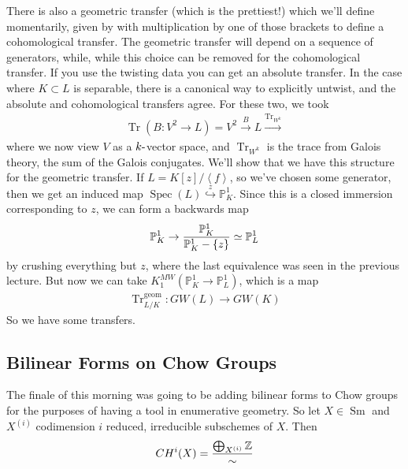 There is also a geometric transfer (which is the prettiest!) which we'll
define momentarily, given by with multiplication by one of those
brackets to define a cohomological transfer. The geometric transfer will
depend on a sequence of generators, while, while this choice can be
removed for the cohomological transfer. If you use the twisting data you
can get an absolute transfer. In the case where \(K\subset L\) is
separable, there is a canonical way to explicitly untwist, and the
absolute and cohomological transfers agree. For these two, we took
\begin{align*}
\operatorname{Tr}(B: V^2 \to L) = V^2 \xrightarrow{B} L \xrightarrow{\operatorname{Tr}_{W^k}}
\end{align*}
where we now view \(V\) as a \(k{\hbox{-}}\)vector space, and
\(\operatorname{Tr}_{W^k}\) is the trace from Galois theory, the sum of
the Galois conjugates. We'll show that we have this structure for the
geometric transfer. If \(L = K[z]/\left\langle{f}\right\rangle\), so
we've chosen some generator, then we get an induced map
\(\operatorname{Spec}(L) \overset{z}\hookrightarrow{\mathbb{P}}^1_K\).
Since this is a closed immersion corresponding to \(z\), we can form a
backwards map
\begin{align*}
{\mathbb{P}}^1_K \to {{\mathbb{P}}^1_K \over {\mathbb{P}}^1_K-\left\{{z}\right\}} \simeq{\mathbb{P}}^1_L
\end{align*}
by crushing everything but \(z\), where the last equivalence was seen in
the previous lecture. But now we can take
\(K^{MW}_1({\mathbb{P}}^1_K \to {\mathbb{P}}^1_L)\), which is a map
\begin{align*}
\operatorname{Tr}_{L/K}^{\text{geom}}:  GW(L) \to GW(K)
\end{align*}
So we have some transfers.

\hypertarget{bilinear-forms-on-chow-groups}{%
\subsection{Bilinear Forms on Chow
Groups}\label{bilinear-forms-on-chow-groups}}

The finale of this morning was going to be adding bilinear forms to Chow
groups for the purposes of having a tool in enumerative geometry. So let
\(X\in{\operatorname{Sm}}\) and \(X^{(i)}\) codimension \(i\) reduced,
irreducible subschemes of \(X\). Then
\begin{align*}
CH^i(X) = {\bigoplus_{X^{(i)}} {\mathbb{Z}}\over \sim}
\end{align*}

